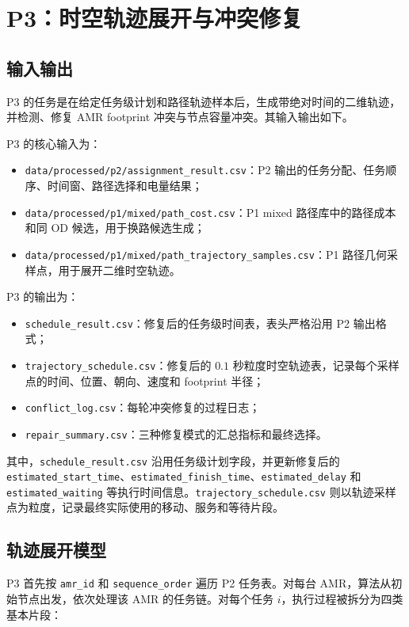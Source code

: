 \section{P3：时空轨迹展开与冲突修复}

\subsection{输入输出}

P3 的任务是在给定任务级计划和路径轨迹样本后，生成带绝对时间的二维轨迹，并检测、修复 AMR footprint 冲突与节点容量冲突。其输入输出如下。

P3 的核心输入为：

\begin{itemize}
  \item \verb|data/processed/p2/assignment_result.csv|：P2 输出的任务分配、任务顺序、时间窗、路径选择和电量结果；
  \item \verb|data/processed/p1/mixed/path_cost.csv|：P1 mixed 路径库中的路径成本和同 OD 候选，用于换路候选生成；
  \item \verb|data/processed/p1/mixed/path_trajectory_samples.csv|：P1 路径几何采样点，用于展开二维时空轨迹。
\end{itemize}

P3 的输出为：

\begin{itemize}
  \item \verb|schedule_result.csv|：修复后的任务级时间表，表头严格沿用 P2 输出格式；
  \item \verb|trajectory_schedule.csv|：修复后的 $0.1$ 秒粒度时空轨迹表，记录每个采样点的时间、位置、朝向、速度和 footprint 半径；
  \item \verb|conflict_log.csv|：每轮冲突修复的过程日志；
  \item \verb|repair_summary.csv|：三种修复模式的汇总指标和最终选择。
\end{itemize}

其中，\verb|schedule_result.csv| 沿用任务级计划字段，并更新修复后的 \verb|estimated_start_time|、\verb|estimated_finish_time|、\verb|estimated_delay| 和 \verb|estimated_waiting| 等执行时间信息。\verb|trajectory_schedule.csv| 则以轨迹采样点为粒度，记录最终实际使用的移动、服务和等待片段。

\subsection{轨迹展开模型}

P3 首先按 \verb|amr_id| 和 \verb|sequence_order| 遍历 P2 任务表。对每台 AMR，算法从初始节点出发，依次处理该 AMR 的任务链。对每个任务 $i$，执行过程被拆分为四类基本片段：

